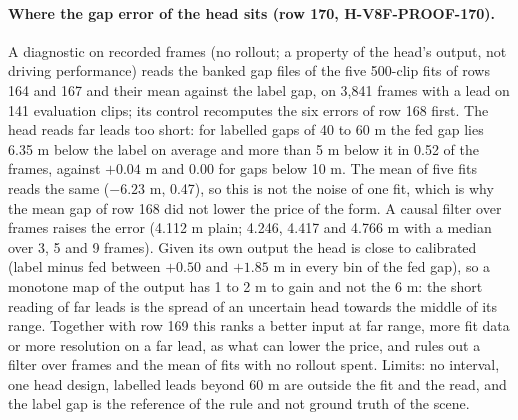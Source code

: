 \paragraph{Where the gap error of the head sits (row 170, H-V8F-PROOF-170).} A  diagnostic on recorded frames (no rollout; a property of the head's output, not driving performance) reads the banked gap files of the five 500-clip fits of rows 164 and 167 and their mean against the label gap, on 3,841 frames with a lead on 141 evaluation clips; its control recomputes the six errors of row 168 first. The head reads far leads too short: for labelled gaps of 40 to 60 m the fed gap lies 6.35 m below the label on average and more than 5 m below it in 0.52 of the frames, against $+0.04$ m and 0.00 for gaps below 10 m. The mean of five fits reads the same ($-6.23$ m, 0.47), so this is not the noise of one fit, which is why the mean gap of row 168 did not lower the price of the form. A causal filter over frames raises the error (4.112 m plain; 4.246, 4.417 and 4.766 m with a median over 3, 5 and 9 frames). Given its own output the head is close to calibrated (label minus fed between $+0.50$ and $+1.85$ m in every bin of the fed gap), so a monotone map of the output has 1 to 2 m to gain and not the 6 m: the short reading of far leads is the spread of an uncertain head towards the middle of its range. Together with row 169 this ranks a better input at far range, more fit data or more resolution on a far lead, as what can lower the price, and rules out a filter over frames and the mean of fits with no rollout spent. Limits: no interval, one head design, labelled leads beyond 60 m are outside the fit and the read, and the label gap is the reference of the rule and not ground truth of the scene.

